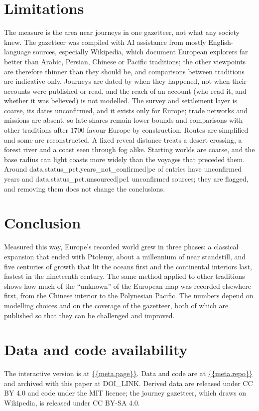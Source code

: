\documentclass[11pt,a4paper]{article}
\begin{document}
\section{Limitations}
The measure is the area near journeys in one gazetteer, not what any society knew. The gazetteer was compiled with AI assistance from mostly English-language sources, especially Wikipedia, which document European explorers far better than Arabic, Persian, Chinese or Pacific traditions; the other viewpoints are therefore thinner than they should be, and comparisons between traditions are indicative only. Journeys are dated by when they happened, not when their accounts were published or read, and the reach of an account (who read it, and whether it was believed) is not modelled. The survey and settlement layer is coarse, its dates unconfirmed, and it exists only for Europe; trade networks and missions are absent, so late shares remain lower bounds and comparisons with other traditions after 1700 favour Europe by construction. Routes are simplified and some are reconstructed. A fixed reveal distance treats a desert crossing, a forest river and a coast seen through fog alike. Starting worlds are coarse, and the base radius can light coasts more widely than the voyages that preceded them. Around {{data.status_pct.years_not_confirmed|pc}} of entries have unconfirmed years and {{data.status_pct.unsourced|pc1}} unconfirmed sources; they are flagged, and removing them does not change the conclusions.

\section{Conclusion}
Measured this way, Europe's recorded world grew in three phases: a classical expansion that ended with Ptolemy, about a millennium of near standstill, and five centuries of growth that lit the oceans first and the continental interiors last, fastest in the nineteenth century. The same method applied to other traditions shows how much of the ``unknown'' of the European map was recorded elsewhere first, from the Chinese interior to the Polynesian Pacific. The numbers depend on modelling choices and on the coverage of the gazetteer, both of which are published so that they can be challenged and improved.

\section*{Data and code availability}
The interactive version is at \url{{{meta.page}}}. Data and code are at \url{{{meta.repo}}} and archived with this paper at {{DOI_LINK}}. Derived data are released under CC BY 4.0 and code under the MIT licence; the journey gazetteer, which draws on Wikipedia, is released under CC BY-SA 4.0.
\end{document}

